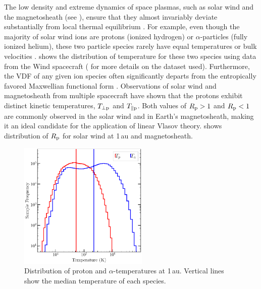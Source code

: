         The low density and extreme dynamics of space plasmas, such as  solar wind and the
        magnetosheath (see ), ensure that they almost invariably deviate
        substantially from local thermal equilibrium \citep{Marsch2006a,Verscharen2019}. For
        example, even though the majority of solar wind ions are protons (ionized hydrogen) or
        $\alpha$-particles (fully ionized helium), these two particle species rarely have equal
        temperatures or bulk velocities \citep[see,
        e.g.,][]{Feldman1974a,Marsch1982,Hefti1998,Kasper2008,Maruca2013a}. 
        shows the distribution of temperature for these two species using data from the Wind
        spacecraft ( for more details on the dataset used). Furthermore, the VDF of
        any given ion species often significantly departs from the entropically favored Maxwellian
        functional form \citep{Feldman1973a,Feldman1974,Marsch1982b, Alterman2018}. Observations of
        solar wind and magnetosheath from multiple spacecraft
        \citep{Feldman1973b,Marsch1982b,Kasper2002} have shown that the protons exhibit distinct
        kinetic temperatures, $T_{\rm \perp p}$ and $T_{\rm \parallel p}$. Both values of $R_{\rm p}
        > 1$ and $R_{\rm p} < 1$ are commonly observed in the solar wind and in Earth's
        magnetosheath, making it an ideal candidate for the application of linear Vlasov theory.
         shows distribution of $R_{\rm p}$ for solar wind at 1\,au and
        magnetosheath.
        \begin{figure}
            \begin{center}
                \includegraphics[width=0.55\textwidth]{figures/chap2/proton_alpha_temp_dist_wnd.pdf}
                \caption[Temperature distribution at 1\,au]{Distribution of proton and $\alpha$-temperatures at 1\,au. Vertical lines show the median temperature of each species.}
                \label{fig:temp_1au}
            \end{center}
        \end{figure}

